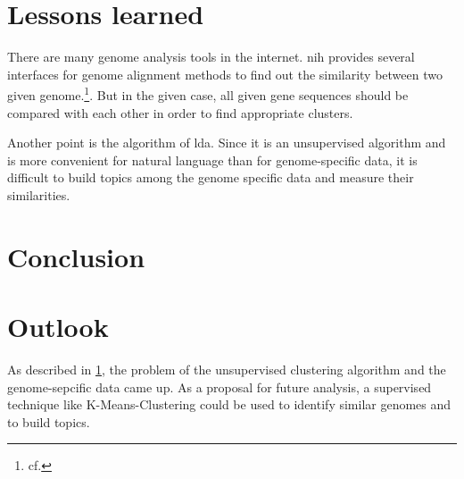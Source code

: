 \section{Lessons learned}\label{lessons_learned}

There are many genome analysis tools in the internet. \gls{nih} provides several interfaces for genome alignment methods to find out the similarity between two given genome.\footnote{cf.\autocite{blast}}.
But in the given case, all given gene sequences should be compared with each other in order to find appropriate clusters.

Another point is the algorithm of \gls{lda}. Since it is an unsupervised algorithm and is more convenient for natural language than for genome-specific data, it is difficult to build topics among the genome specific data and measure their similarities.

\section{Conclusion}\label{conclusion}


\section{Outlook}\label{outlook}

As described in \ref{lessons_learned}, the problem of the unsupervised clustering algorithm and the genome-sepcific data came up. As a proposal for future analysis, a supervised technique like K-Means-Clustering could be used to identify similar genomes and to build topics. 



\newpage







